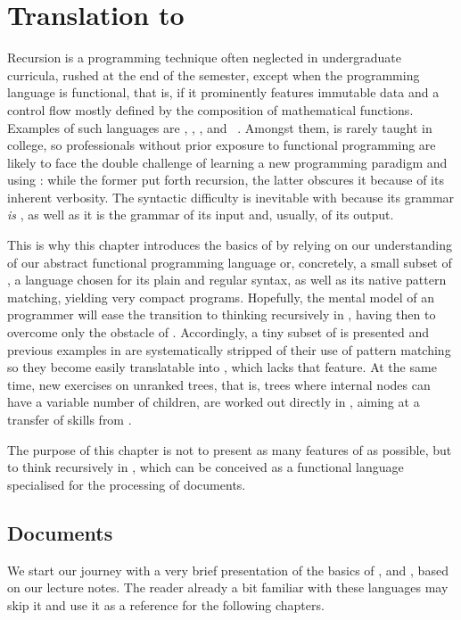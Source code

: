 \chapter{Translation to \XSLT}

Recursion is a programming technique often neglected in undergraduate
curricula, rushed at the end of the semester, except when the
programming language is functional, that is, if it prominently
features immutable data and a control flow mostly defined by the
composition of mathematical functions. Examples of such languages are
\Scheme, \Haskell, \OCaml, \Erlang and \XSLT~\citep{Kay_2008}. Amongst
them, \XSLT is rarely taught in college, so professionals without
prior exposure to functional programming are likely to face the double
challenge of learning a new programming paradigm and using \XML: while
the former put forth recursion, the latter obscures it because of its
inherent verbosity. The syntactic difficulty is inevitable with \XSLT
because its grammar \emph{is} \XML, as well as it is the grammar of
its input and, usually, of its output.

This is why this chapter introduces the basics of \XSLT by relying on
our understanding of our abstract functional programming language or,
concretely, a small subset of \Erlang, a language chosen for its plain
and regular syntax, as well as its native pattern matching, yielding
very compact programs. Hopefully, the mental model of an \Erlang
programmer will ease the transition to thinking recursively in \XSLT,
having then to overcome only the obstacle of \XML. Accordingly, a tiny
subset of \XSLT is presented and previous examples in \Erlang are
systematically stripped of their use of pattern matching so they
become easily translatable into \XSLT, which lacks that feature. At
the same time, new exercises on unranked trees, that is, trees where
internal nodes can have a variable number of children, are worked out
directly in \XSLT, aiming at a transfer of skills from \Erlang.

The purpose of this chapter is not to present as many features of
\XSLT as possible, but to think recursively in \XSLT, which can be
conceived as a functional language specialised for the processing of
\XML documents.

\section{Documents}

We start our journey with a very brief presentation of the basics of
\XML, \HTML and \DTD, based on our lecture notes. The reader already a
bit familiar with these languages may skip it and use it as a
reference for the following chapters.

